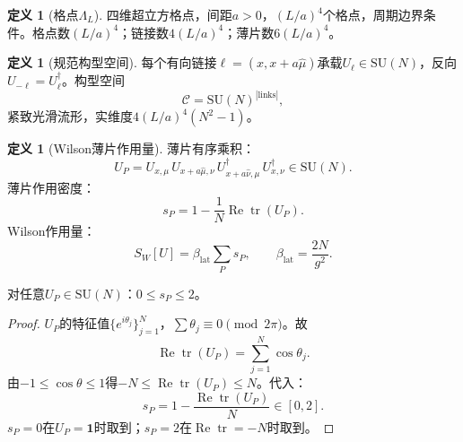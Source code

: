 \documentclass[12pt,a4paper]{article}
\theoremstyle{plain}
\theoremstyle{definition}\newtheorem{definition}[theorem]{定义}
\theoremstyle{remark}\newtheorem{remark}[theorem]{注记}
\begin{document}
\begin{definition}[格点$\Lambda_L$]\label{def:lattice}
四维超立方格点，间距$a>0$，$(L/a)^4$个格点，周期边界条件。格点数$(L/a)^4$；链接数$4(L/a)^4$；薄片数$6(L/a)^4$。
\end{definition}

\begin{definition}[规范构型空间]\label{def:config}
每个有向链接$\ell=(x,x+a\hat\mu)$承载$U_\ell\in\mathrm{SU}(N)$，反向$U_{-\ell}=U_\ell^\dagger$。构型空间
\begin{equation}\label{eq:config}
\mathcal{C} = \mathrm{SU}(N)^{|\mathrm{links}|},
\end{equation}
紧致光滑流形，实维度$4(L/a)^4(N^2-1)$。
\end{definition}

\begin{definition}[Wilson薄片作用量]\label{def:wilson}
薄片有序乘积：
\begin{equation}\label{eq:UP}
U_P = U_{x,\mu}\,U_{x+a\hat\mu,\nu}\,U_{x+a\hat\nu,\mu}^\dagger\,U_{x,\nu}^\dagger \in \mathrm{SU}(N).
\end{equation}
薄片作用密度：
\begin{equation}\label{eq:sp}
s_P = 1 - \frac{1}{N}\operatorname{Re}\operatorname{tr}(U_P).
\end{equation}
Wilson作用量：
\begin{equation}\label{eq:SW}
S_W[U] = \beta_{\mathrm{lat}}\sum_P s_P, \qquad \beta_{\mathrm{lat}} = \frac{2N}{g^2}.
\end{equation}
\end{definition}

\begin{lemma}[$s_P$的界]\label{lem:sp}
对任意$U_P\in\mathrm{SU}(N)$：$0\leq s_P\leq 2$。
\end{lemma}

\begin{proof}
$U_P$的特征值$\{e^{i\theta_j}\}_{j=1}^N$，$\sum\theta_j\equiv 0\pmod{2\pi}$。故
\begin{equation}
\operatorname{Re}\operatorname{tr}(U_P) = \sum_{j=1}^N \cos\theta_j.
\end{equation}
由$-1\leq\cos\theta\leq 1$得$-N\leq\operatorname{Re}\operatorname{tr}(U_P)\leq N$。代入：
\begin{equation}
s_P = 1 - \frac{\operatorname{Re}\operatorname{tr}(U_P)}{N} \in [0,2].
\end{equation}
$s_P=0$在$U_P=\mathbf{1}$时取到；$s_P=2$在$\operatorname{Re}\operatorname{tr}=-N$时取到。
\end{proof}
\end{document}
